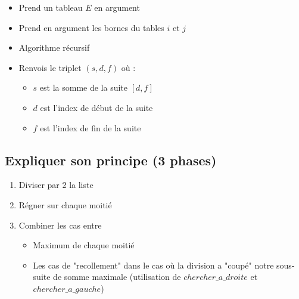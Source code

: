 \documentclass[11pt,a4paper]{article}
\begin{document}
	\begin{itemize}
		\item Prend un tableau $E$ en argument
		\item Prend en argument les bornes du tables $i$ et $j$
		\item Algorithme récursif
		\item Renvois le triplet $(s,d,f)$ où :
			\begin{itemize}
				\item $s$ est la somme de la suite $[d, f]$
				\item $d$ est l'index de début de la suite
				\item $f$ est l'index de fin de la suite
			\end{itemize}
	\end{itemize}
	
	\subsection{Expliquer son principe (3 phases)}
	
	

	\begin{center}
		\begin{enumerate}[label=Phase \arabic* :]
			\item Diviser par 2 la liste
			\item Régner sur chaque moitié
			\item Combiner les cas entre
			\begin{itemize}[label={$\to$}]
				\item Maximum de chaque moitié
				\item Les cas de "recollement" dans le cas où la division a "coupé" notre sous-suite de somme maximale (utilisation de $chercher\_a\_droite$ et $chercher\_a\_gauche$)
			\end{itemize}
		\end{enumerate}
	
	\end{center}
	
\end{document}
